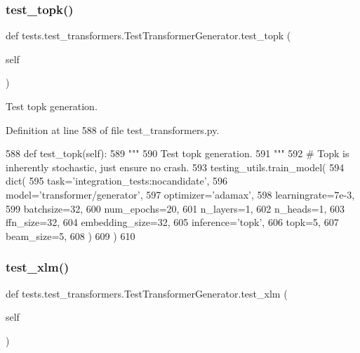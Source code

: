 \subsubsection{\texorpdfstring{test\+\_\+topk()}{test\_topk()}}
{\footnotesize\ttfamily def tests.\+test\+\_\+transformers.\+Test\+Transformer\+Generator.\+test\+\_\+topk (\begin{DoxyParamCaption}\item[{}]{self }\end{DoxyParamCaption})}

\begin{DoxyVerb}Test topk generation.
\end{DoxyVerb}
 

Definition at line 588 of file test\+\_\+transformers.\+py.


\begin{DoxyCode}
588     \textcolor{keyword}{def }test\_topk(self):
589         \textcolor{stringliteral}{"""}
590 \textcolor{stringliteral}{        Test topk generation.}
591 \textcolor{stringliteral}{        """}
592         \textcolor{comment}{# Topk is inherently stochastic, just ensure no crash.}
593         testing\_utils.train\_model(
594             dict(
595                 task=\textcolor{stringliteral}{'integration\_tests:nocandidate'},
596                 model=\textcolor{stringliteral}{'transformer/generator'},
597                 optimizer=\textcolor{stringliteral}{'adamax'},
598                 learningrate=7e-3,
599                 batchsize=32,
600                 num\_epochs=20,
601                 n\_layers=1,
602                 n\_heads=1,
603                 ffn\_size=32,
604                 embedding\_size=32,
605                 inference=\textcolor{stringliteral}{'topk'},
606                 topk=5,
607                 beam\_size=5,
608             )
609         )
610 
\end{DoxyCode}
\mbox{\label{classtests_1_1test__transformers_1_1TestTransformerGenerator_a42e386425e0e497ccb97a73409192990}} 
\subsubsection{\texorpdfstring{test\+\_\+xlm()}{test\_xlm()}}
{\footnotesize\ttfamily def tests.\+test\+\_\+transformers.\+Test\+Transformer\+Generator.\+test\+\_\+xlm (\begin{DoxyParamCaption}\item[{}]{self }\end{DoxyParamCaption})}

